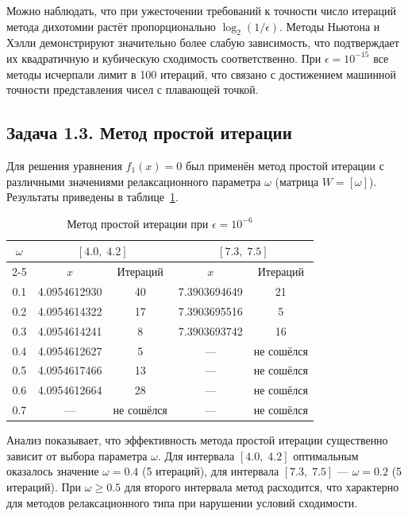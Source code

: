 \documentclass[a4paper]{article}
\begin{document}
Можно наблюдать, что при ужесточении требований к точности число итераций метода дихотомии растёт пропорционально $\log_2(1/\epsilon)$. Методы Ньютона и Хэлли демонстрируют значительно более слабую зависимость, что подтверждает их квадратичную и кубическую сходимость соответственно. При $\epsilon = 10^{-15}$ все методы исчерпали лимит в 100 итераций, что связано с достижением машинной точности представления чисел с плавающей точкой.

\subsection*{Задача 1.3. Метод простой итерации}

Для решения уравнения $f_1(x) = 0$ был применён метод простой итерации с различными значениями релаксационного параметра $\omega$ (матрица $W = [\omega]$). Результаты приведены в таблице~\ref{tab:task1_3}.

\begin{table}[H]
\centering
\caption{Метод простой итерации при $\epsilon = 10^{-6}$}
\label{tab:task1_3}
\begin{tabular}{|c|c|c|c|c|}
\hline
\multirow{2}{*}{$\omega$} & \multicolumn{2}{c|}{$[4.0,\;4.2]$} & \multicolumn{2}{c|}{$[7.3,\;7.5]$} \\
\cline{2-5}
& $x$ & Итераций & $x$ & Итераций \\
\hline
0.1 & 4.0954612930 & 40  & 7.3903694649 & 21 \\
0.2 & 4.0954614322 & 17  & 7.3903695516 & 5  \\
0.3 & 4.0954614241 & 8   & 7.3903693742 & 16 \\
0.4 & 4.0954612627 & 5   & --- & не сошёлся \\
0.5 & 4.0954617466 & 13  & --- & не сошёлся \\
0.6 & 4.0954612664 & 28  & --- & не сошёлся \\
0.7 & --- & не сошёлся & --- & не сошёлся \\
\hline
\end{tabular}
\end{table}

Анализ показывает, что эффективность метода простой итерации существенно зависит от выбора параметра $\omega$. Для интервала $[4.0,\;4.2]$ оптимальным оказалось значение $\omega = 0.4$ (5 итераций), для интервала $[7.3,\;7.5]$ — $\omega = 0.2$ (5 итераций). При $\omega \ge 0.5$ для второго интервала метод расходится, что характерно для методов релаксационного типа при нарушении условий сходимости.
\end{document}
